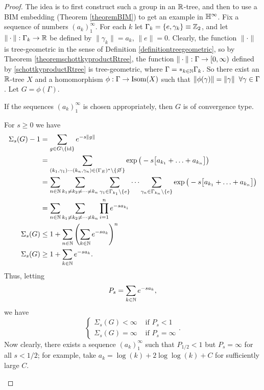 \begin{proof}
The idea is to first construct such a group in an $\R$-tree, and then to use a BIM embedding (Theorem \ref{theoremBIM}) to get an example in $\H^\infty$. Fix a sequence of numbers $(a_k)_1^\infty$. For each $k$ let $\Gamma_k = \{e,\gamma_k\} \equiv \Z_2$, and let $\|\cdot\|:\Gamma_k\to\R$ be defined by $\|\gamma_k\| = a_k$, $\|e\| = 0$. Clearly, the function $\|\cdot\|$ is tree-geometric in the sense of Definition \ref{definitiontreegeometric}, so by Theorem \ref{theoremschottkyproductRtree}, the function $\|\cdot\|:\Gamma\to{[0,\infty)}$ defined by \eqref{schottkyproductRtree} is tree-geometric, where $\Gamma = \ast_{k\in\N} \Gamma_k$. So there exist an $\R$-tree $X$ and a homomorphism $\phi:\Gamma\to\operatorname{Isom}(X)$ such that $\|\phi(\gamma)\| = \|\gamma\| \;\;\forall\gamma\in\Gamma$. Let $G = \phi(\Gamma)$.
\begin{claim}
If the sequences $(a_k)_1^\infty$ is chosen appropriately, then $G$ is of convergence type.
\end{claim}
\begin{subproof}
For $s\geq 0$ we have
\begin{align*}
\Sigma_s(G) - 1 &= \sum_{g\in G\butnot\{\id\}} e^{-s\dogo g}\\
&= \sum_{(k_1,\gamma_1)\cdots(k_n,\gamma_n)\in (\Gamma_E)^*\butnot\{\smallemptyset\}} \exp\big(-s\big[a_{k_1} +\ldots + a_{k_n}\big]\big)\\
&= \sum_{n\in\N} \sum_{k_1\neq k_2\neq \cdots \neq k_n} \sum_{\gamma_1\in \Gamma_{k_1}\butnot\{e\}}\cdots\sum_{\gamma_n\in \Gamma_{k_n}\butnot\{e\}} \exp\big(-s\big[a_{k_1} + \ldots + a_{k_n}\big]\big)\\
&= \sum_{n\in\N} \sum_{k_1\neq k_2\neq \cdots \neq k_n} \prod_{i = 1}^n e^{-s a_{k_i}}\\
\Sigma_s(G) &\leq 1 + \sum_{n\in\N} \left( \sum_{k\in\N} e^{-s a_k}\right)^n\\
\Sigma_s(G) &\geq 1 + \sum_{k\in\N} e^{-s a_k}.
\end{align*}
Thus, letting
\[
P_s = \sum_{k\in\N} e^{-s a_k},
\]
we have
\begin{equation}
\label{esak}
\begin{cases}
\Sigma_s(G) < \infty & \text{ if } P_s < 1 \\
\Sigma_s(G) = \infty & \text{ if } P_s = \infty
\end{cases}.
\end{equation}
Now clearly, there exists a sequence $(a_k)_1^\infty$ such that $P_{1/2} < 1$ but $P_s = \infty$ for all $s < 1/2$; for example, take $a_k = \log(k) + 2\log\log(k) + C$ for sufficiently large $C$.

\end{subproof}
\end{proof}
